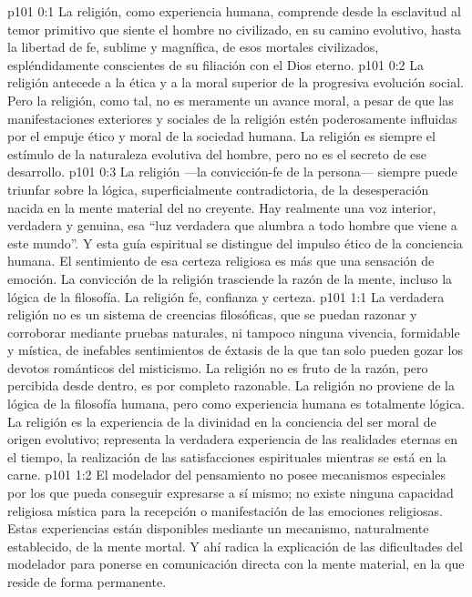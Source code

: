 \author{Melquisedec}
\vs p101 0:1 La religión, como experiencia humana, comprende desde la esclavitud al temor primitivo que siente el hombre no civilizado, en su camino evolutivo, hasta la libertad de fe, sublime y magnífica, de esos mortales civilizados, espléndidamente conscientes de su filiación con el Dios eterno.
\vs p101 0:2 La religión antecede a la ética y a la moral superior de la progresiva evolución social. Pero la religión, como tal, no es meramente un avance moral, a pesar de que las manifestaciones exteriores y sociales de la religión estén poderosamente influidas por el empuje ético y moral de la sociedad humana. La religión es siempre el estímulo de la naturaleza evolutiva del hombre, pero no es el secreto de ese desarrollo.
\vs p101 0:3 La religión ---la convicción\hyp{}fe de la persona--- siempre puede triunfar sobre la lógica, superficialmente contradictoria, de la desesperación nacida en la mente material del no creyente. Hay realmente una voz interior, verdadera y genuina, esa “luz verdadera que alumbra a todo hombre que viene a este mundo”. Y esta guía espiritual se distingue del impulso ético de la conciencia humana. El sentimiento de esa certeza religiosa es más que una sensación de emoción. La convicción de la religión trasciende la razón de la mente, incluso la lógica de la filosofía. La religión  fe, confianza y certeza.
\vs p101 1:1 La verdadera religión no es un sistema de creencias filosóficas, que se puedan razonar y corroborar mediante pruebas naturales, ni tampoco ninguna vivencia, formidable y mística, de inefables sentimientos de éxtasis de la que tan solo pueden gozar los devotos románticos del misticismo. La religión no es fruto de la razón, pero percibida desde dentro, es por completo razonable. La religión no proviene de la lógica de la filosofía humana, pero como experiencia humana es totalmente lógica. La religión es la experiencia de la divinidad en la conciencia del ser moral de origen evolutivo; representa la verdadera experiencia de las realidades eternas en el tiempo, la realización de las satisfacciones espirituales mientras se está en la carne.
\vs p101 1:2 \pc El modelador del pensamiento no posee mecanismos especiales por los que pueda conseguir expresarse a sí mismo; no existe ninguna capacidad religiosa mística para la recepción o manifestación de las emociones religiosas. Estas experiencias están disponibles mediante un mecanismo, naturalmente establecido, de la mente mortal. Y ahí radica la explicación de las dificultades del modelador para ponerse en comunicación directa con la mente material, en la que reside de forma permanente.
